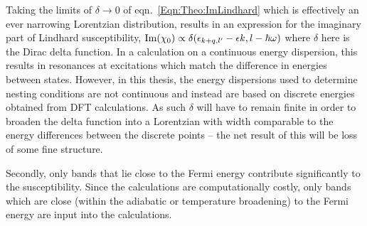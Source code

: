 Taking the limits of $\delta \to 0$ of eqn.~\ref{Eqn:Theo:ImLindhard} which is effectively an ever narrowing Lorentzian distribution, results in an expression for the imaginary part of Lindhard susceptibility, $\operatorname{Im}(\chi_0)\propto \delta(\epsilon_{k+q,l^\prime} - \epsilon{k,l} - \hbar\omega)$ where $\delta$ here is the Dirac delta function. In a calculation on a continuous energy dispersion, this results in resonances at excitations which match the difference in energies between states. However, in this thesis, the energy dispersions used to determine nesting conditions are not continuous and instead are based on discrete energies obtained from \ac{DFT} calculations. As such $\delta$ will have to remain finite in order to broaden the delta function into a Lorentzian with width comparable to the energy differences between the discrete points -- the net result of this will be loss of some fine structure.

Secondly, only bands that lie close to the Fermi energy contribute significantly to the susceptibility. Since the calculations are computationally costly, only bands which are close (within the adiabatic or temperature broadening) to the Fermi energy are input into the calculations.
